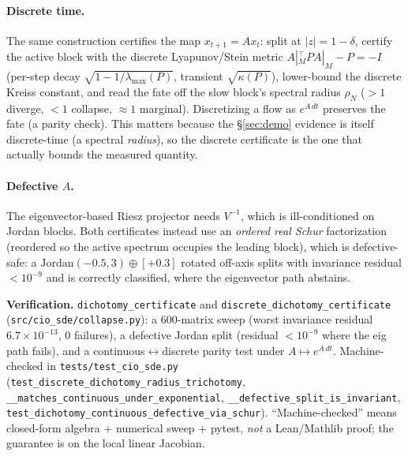 \documentclass[11pt]{article}
\theoremstyle{definition}
\begin{document}
\paragraph{Discrete time.} The same construction certifies the map $x_{t+1}=Ax_t$: split
at $|z|=1-\delta$, certify the active block with the discrete Lyapunov/Stein metric
$A|_M^\top P A|_M-P=-I$ (per-step decay $\sqrt{1-1/\lambda_{\max}(P)}$, transient
$\sqrt{\kappa(P)}$), lower-bound the discrete Kreiss constant, and read the fate off the
slow block's spectral radius $\rho_N$ ($>1$ diverge, $<1$ collapse, $\approx1$ marginal).
Discretizing a flow as $e^{A\,dt}$ preserves the fate (a parity check). This matters because
the \S\ref{sec:demo} evidence is itself discrete-time (a spectral \emph{radius}), so the
discrete certificate is the one that actually bounds the measured quantity.

\paragraph{Defective $A$.} The eigenvector-based Riesz projector needs $V^{-1}$, which is
ill-conditioned on Jordan blocks. Both certificates instead use an \emph{ordered real Schur}
factorization (reordered so the active spectrum occupies the leading block), which is
defective-safe: a $\mathrm{Jordan}(-0.5,3)\oplus[+0.3]$ rotated off-axis splits with
invariance residual $<10^{-9}$ and is correctly classified, where the eigenvector path
abstains.

\begin{verifybox}
\textbf{Verification.} \texttt{dichotomy\_certificate} and
\texttt{discrete\_\allowbreak dichotomy\_\allowbreak certificate}
(\texttt{src/cio\_sde/collapse.py}): a $600$-matrix sweep (worst invariance residual
$6.7\times10^{-13}$, $0$ failures), a defective Jordan split (residual $<10^{-9}$ where the
eig path fails), and a continuous$\leftrightarrow$discrete parity test under
$A\mapsto e^{A\,dt}$. Machine-checked in \texttt{tests/test\_cio\_sde.py}
(\texttt{test\_discrete\_dichotomy\_radius\_trichotomy},
\texttt{\_\_matches\_continuous\_under\_exponential},
\texttt{\_\_defective\_split\_is\_invariant},
\texttt{test\_dichotomy\_continuous\_defective\_via\_schur}). ``Machine-checked'' means
closed-form algebra $+$ numerical sweep $+$ pytest, \emph{not} a Lean/Mathlib proof; the
guarantee is on the local linear Jacobian.
\end{verifybox}

\end{document}
